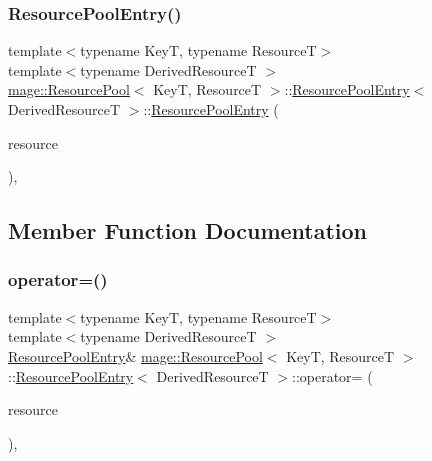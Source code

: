 \subsubsection{\texorpdfstring{Resource\+Pool\+Entry()}{ResourcePoolEntry()}\hspace{0.1cm}{\footnotesize\ttfamily [3/3]}}
{\footnotesize\ttfamily template$<$typename KeyT, typename ResourceT$>$ \\
template$<$typename Derived\+ResourceT $>$ \\
\hyperlink{classmage_1_1_resource_pool}{mage\+::\+Resource\+Pool}$<$ KeyT, ResourceT $>$\+::\hyperlink{structmage_1_1_resource_pool_1_1_resource_pool_entry}{Resource\+Pool\+Entry}$<$ Derived\+ResourceT $>$\+::\hyperlink{structmage_1_1_resource_pool_1_1_resource_pool_entry}{Resource\+Pool\+Entry} (\begin{DoxyParamCaption}\item[{\hyperlink{structmage_1_1_resource_pool_1_1_resource_pool_entry}{Resource\+Pool\+Entry}$<$ Derived\+ResourceT $>$ \&\&}]{resource }\end{DoxyParamCaption})\hspace{0.3cm}{\ttfamily [private]}, {\ttfamily [delete]}}



\subsection{Member Function Documentation}
\hypertarget{structmage_1_1_resource_pool_1_1_resource_pool_entry_a2a08bf48f2dce191a23f088530879ca0}{}\label{structmage_1_1_resource_pool_1_1_resource_pool_entry_a2a08bf48f2dce191a23f088530879ca0} 
\subsubsection{\texorpdfstring{operator=()}{operator=()}\hspace{0.1cm}{\footnotesize\ttfamily [1/2]}}
{\footnotesize\ttfamily template$<$typename KeyT, typename ResourceT$>$ \\
template$<$typename Derived\+ResourceT $>$ \\
\hyperlink{structmage_1_1_resource_pool_1_1_resource_pool_entry}{Resource\+Pool\+Entry}\& \hyperlink{classmage_1_1_resource_pool}{mage\+::\+Resource\+Pool}$<$ KeyT, ResourceT $>$\+::\hyperlink{structmage_1_1_resource_pool_1_1_resource_pool_entry}{Resource\+Pool\+Entry}$<$ Derived\+ResourceT $>$\+::operator= (\begin{DoxyParamCaption}\item[{const \hyperlink{structmage_1_1_resource_pool_1_1_resource_pool_entry}{Resource\+Pool\+Entry}$<$ Derived\+ResourceT $>$ \&}]{resource }\end{DoxyParamCaption})\hspace{0.3cm}{\ttfamily [private]}, {\ttfamily [delete]}}

